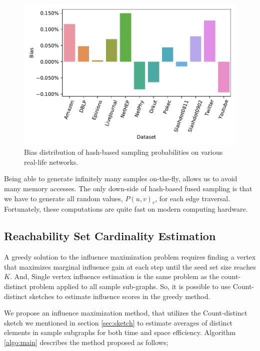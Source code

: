 \documentclass[10pt,journal,compsoc]{IEEEtran}
\begin{document}
\begin{figure}[!ht] 
    \centering
    \includegraphics[width=1\linewidth]{./images/bias.pdf}
    \caption{Bias distribution of hash-based sampling probabilities on various real-life networks.}
    \label{fig:prob-bias} 
\end{figure}

Being able to generate infinitely many samples on-the-fly, allows us to avoid many memory accesses. The only down-side of hash-based fused sampling is that we have to generate all random values,   $P(u,v)_r$, for each edge traversal.  Fortunately, these computations are quite fast on modern computing hardware.

\subsection{Reachability Set Cardinality Estimation}
A greedy solution to the influence maximization problem requires finding a vertex that maximizes marginal influence gain at each step until the seed set size reaches $K$. And, Single vertex influence estimation is the same problem as the count-distinct problem applied to all sample sub-graphs. So, it is possible to use Count-distinct sketches to estimate influence scores in the greedy method. 

We propose an influence maximization method, that utilizes the Count-distinct sketch we mentioned in section \ref{sec:sketch} to estimate averages of distinct elements in sample subgraphs for both time and space efficiency. Algorithm \ref{algo:main} describes the method proposed as follows; 
\end{document}
